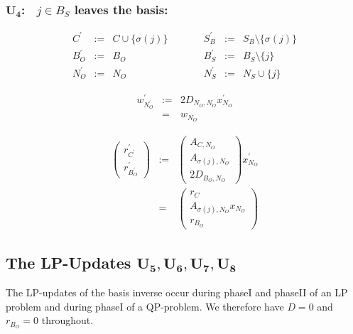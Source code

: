 \documentclass[a4paper]{article}
\begin{document}
\subsubsection{$\mathbf{U_{4}}$:$\quad j \in B_{S}$ leaves the basis:}
\begin{equation}
\label{update:slack_leaves_basis}
\begin{array}{ccccccc}
C^{\prime}      &:=&  C \cup \{\sigma(j)\}
&\quad\quad&
S_{B}^{\prime}  &:=&  S_{B} \setminus \{\sigma(j)\}  \\
B_{O}^{\prime}  &:=&  B_{O}
&\quad\quad&
B_{S}^{\prime}  &:=&  B_{S} \setminus \{j\}  \\
N_{O}^{\prime}  &:=&  N_{O}
&\quad\quad&
N_{S}^{\prime}  &:=&  N_{S} \cup \{j\} 
\end{array}
\end{equation}

\begin{eqnarray}
w_{N_{O}^{\prime}}^{\prime}
&:=&
2D_{N_{O}, N_{O}}x_{N_{O}}^{\prime}
\nonumber \\
&=&
w_{N_{O}}
\end{eqnarray}

\begin{eqnarray}
\left(
\begin{array}{c}
r_{C^{\prime}}^{\prime} \\
\hline
r_{B_{O}^{\prime}}^{\prime}
\end{array}
\right)
&:=&
\left(
\begin{array}{c}
A_{C, N_{O}} \\
\hline
A_{\sigma(j), N_{O}} \\
\hline
2D_{B_{O}, N_{O}} 
\end{array}
\right)
x_{N_{O}}^{\prime}
\nonumber \\
&=&
\left(
\begin{array}{c}
r_{C} \\
\hline
A_{\sigma(j), N_{O}}x_{N_{O}} \\
\hline
r_{B_{O}}
\end{array}
\right)
\end{eqnarray}


\subsection{The LP-Updates $\mathbf{U_{5}}, \mathbf{U_{6}}, 
  \mathbf{U_{7}}, \mathbf{U_{8}}$}
The LP-updates of the basis inverse occur during phaseI and phaseII of an LP
problem and during phaseI of a QP-problem. We therefore have $D=0$ and 
$r_{B_{O}}=0$ throughout.  
\end{document}
